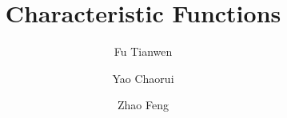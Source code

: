 \documentclass{beamer}
\title{Characteristic Functions}
\author[Fu\and Yao\and Zhao]{Fu Tianwen \and Yao Chaorui \and Zhao Feng}
\institute[CUHK]{the Chinese University of Hong Kong}
\begin{document}
\frame{\titlepage}
\end{document}
